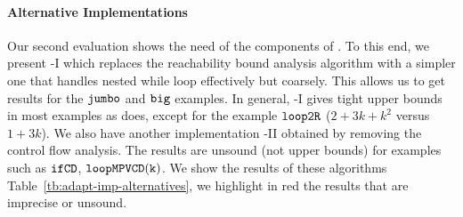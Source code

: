 
{\paragraph{Alternative Implementations}

 Our second evaluation shows the need of the 
components of {\THESYSTEM}. 
To this end, we present {\THESYSTEM}-I which replaces the reachability bound analysis algorithm 
with a simpler one that handles nested while loop effectively but coarsely. This allows us to get results for the $\mathtt{jumbo}$ and $\mathtt{big}$ examples.
In general, {\THESYSTEM}-I gives tight upper bounds in most examples as {\THESYSTEM} does, except for the example $\mathtt{loop2R}$ ($2+3k+k^2$ versus $1+3k$).
We also have another implementation {\THESYSTEM}-II obtained by removing the control flow analysis. The results are unsound (not upper bounds) for examples such as $\mathtt{ifCD}$, $ \mathtt{loopMPVCD(k)} $. 
We show the results of these algorithms Table~\ref{tb:adapt-imp-alternatives}, we highlight in red the results that are imprecise or unsound.
}


